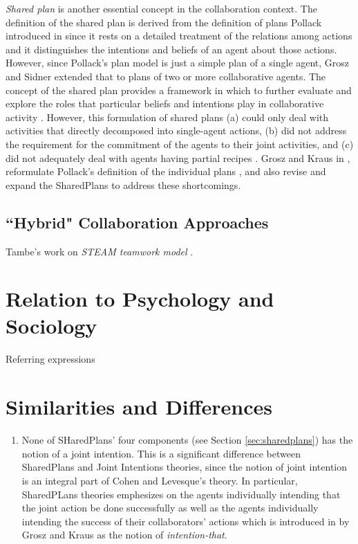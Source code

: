 \documentclass[11pt]{article}
\begin{document}
\textit{Shared plan} is another essential concept in the collaboration context.
The definition of the shared plan is derived from the definition of plans
Pollack introduced in \cite{pollack:plan-inference,
pollack:plan-mental-attitudes} since it rests on a detailed treatment of the
relations among actions and it distinguishes the intentions and beliefs of an
agent about those actions. However, since Pollack's plan model is just a simple
plan of a single agent, Grosz and Sidner extended that to plans of two or more
collaborative agents. The concept of the shared plan provides a framework in
which to further evaluate and explore the roles that particular beliefs and
intentions play in collaborative activity \cite{lochbaum:plan-models}. However,
this formulation of shared plans (a) could only deal with activities that
directly decomposed into single-agent actions, (b) did not address the
requirement for the commitment of the agents to their joint activities, and (c)
did not adequately deal with agents having partial recipes
\cite{grosz:collaboration}. Grosz and Kraus in \cite{grosz:collaboration},
reformulate Pollack's definition of the individual plans
\cite{pollack:plan-mental-attitudes}, and also revise and expand the SharedPlans
to address these shortcomings.

\subsection{``Hybrid" Collaboration Approaches}

Tambe's work on \textit{STEAM teamwork model} \cite{tambe:flexible-teamwork}.

\section{Relation to Psychology and Sociology}

Referring expressions \cite{heeman:model-collaboration-referring}

\section{Similarities and Differences}

\begin{enumerate}
  \item None of SHaredPlans' four components (see Section \ref{sec:sharedplans})
  has the notion of a joint intention. This is a significant difference between
  SharedPlans and Joint Intentions theories, since the notion of joint intention
  is an integral part of Cohen and Levesque's theory. In particular, SharedPLans
  theories emphesizes on the agents individually intending that the joint action
  be done successfully as well as the agents individually intending the success
  of their collaborators' actions which is introduced in
  \cite{grosz:collaboration} by Grosz and Kraus as the notion of
  \textit{intention-that}.
\end{enumerate}
\end{document}
